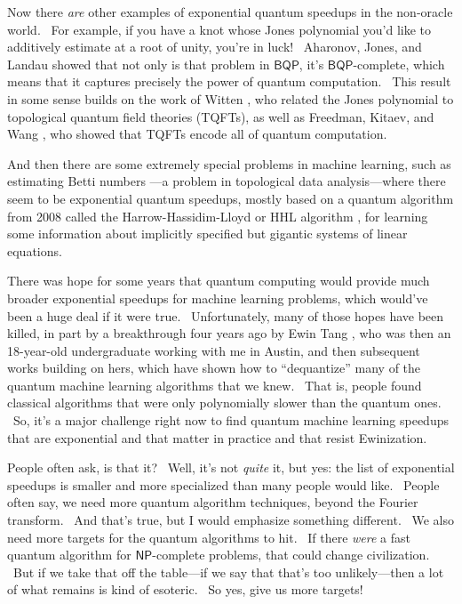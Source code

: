 \documentclass[12pt]{article}
\begin{document}
Now there \emph{are} other examples of exponential quantum speedups in the non-oracle world. \ For example, if you have a knot whose Jones polynomial you'd like to additively estimate at a root of unity, you're in luck! \ Aharonov, Jones, and Landau \cite{ajl} showed that not only is that problem in $\mathsf{BQP}$, it's $\mathsf{BQP}$-complete, which means that it captures precisely the power of quantum computation. \ This result in some sense builds on the work of Witten \cite{witten:jones}, who related the Jones polynomial to topological quantum field theories (TQFTs), as well as Freedman, Kitaev, and Wang \cite{fkw}, who showed that TQFTs encode all of quantum computation.

And then there are some extremely special problems in machine learning, such as estimating Betti numbers \cite{lgz}---a problem in topological data analysis---where there seem to be exponential quantum speedups, mostly based on a quantum algorithm from 2008 called the Harrow-Hassidim-Lloyd or HHL algorithm \cite{hhl}, for learning some information about implicitly specified but gigantic systems of linear equations.

There was hope for some years that quantum computing would provide much broader exponential speedups for machine learning problems, which would've been a huge deal if it were true. \ Unfortunately, many of those hopes have been killed, in part by a breakthrough four years ago by Ewin Tang \cite{tang}, who was then an 18-year-old undergraduate working with me in Austin, and then subsequent works building on hers, which have shown how to ``dequantize'' many of the quantum machine learning algorithms that we knew. \ That is, people found classical algorithms that were only polynomially slower than the quantum ones. \ So, it's a major challenge right now to find quantum machine learning speedups that are exponential and that matter in practice and that resist Ewinization.

People often ask, is that it? \ Well, it's not \emph{quite} it, but yes: the list of exponential speedups is smaller and more specialized than many people would like. \ People often say, we need more quantum algorithm techniques, beyond the Fourier transform. \ And that's true, but I would emphasize something different. \ We also need more targets for the quantum algorithms to hit. \ If there \emph{were} a fast quantum algorithm for $\mathsf{NP}$-complete problems, that could change civilization. \ But if we take that off the table---if we say that that's too unlikely---then a lot of what remains is kind of esoteric. \ So yes, give us more targets!
\end{document}
